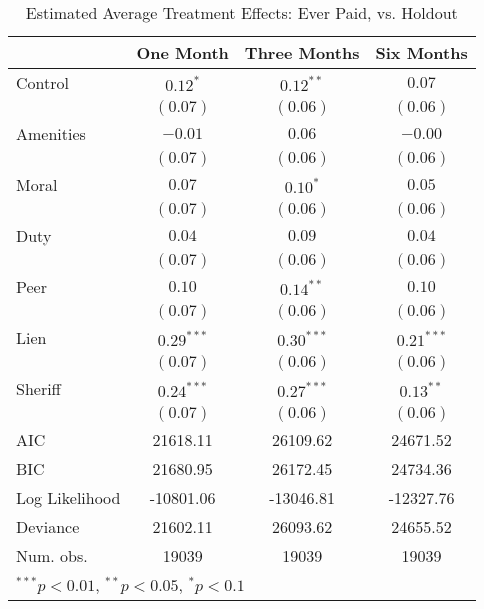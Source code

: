\documentclass[12pt,titlepage]{article}
\begin{document}
\begin{table}[htbp]
\caption{Estimated Average Treatment Effects: Ever Paid, vs. Holdout}
\begin{center}
\begin{tabular}{l c c c }
\hline
               & One Month & Three Months & Six Months \\
\hline
Control        & $0.12^{*}$   & $0.12^{**}$  & $0.07$       \\
               & $(0.07)$     & $(0.06)$     & $(0.06)$     \\
Amenities      & $-0.01$      & $0.06$       & $-0.00$      \\
               & $(0.07)$     & $(0.06)$     & $(0.06)$     \\
Moral          & $0.07$       & $0.10^{*}$   & $0.05$       \\
               & $(0.07)$     & $(0.06)$     & $(0.06)$     \\
Duty           & $0.04$       & $0.09$       & $0.04$       \\
               & $(0.07)$     & $(0.06)$     & $(0.06)$     \\
Peer           & $0.10$       & $0.14^{**}$  & $0.10$       \\
               & $(0.07)$     & $(0.06)$     & $(0.06)$     \\
Lien           & $0.29^{***}$ & $0.30^{***}$ & $0.21^{***}$ \\
               & $(0.07)$     & $(0.06)$     & $(0.06)$     \\
Sheriff        & $0.24^{***}$ & $0.27^{***}$ & $0.13^{**}$  \\
               & $(0.07)$     & $(0.06)$     & $(0.06)$     \\
\hline
AIC            & 21618.11     & 26109.62     & 24671.52     \\
BIC            & 21680.95     & 26172.45     & 24734.36     \\
Log Likelihood & -10801.06    & -13046.81    & -12327.76    \\
Deviance       & 21602.11     & 26093.62     & 24655.52     \\
Num. obs.      & 19039        & 19039        & 19039        \\
\hline
\multicolumn{4}{l}{\scriptsize{$^{***}p<0.01$, $^{**}p<0.05$, $^*p<0.1$}}
\end{tabular}
\label{tbl:reg8_ep}
\end{center}
\end{table}
\end{document}

